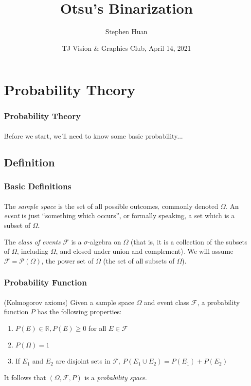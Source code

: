 \documentclass{beamer}                             %
\title[]{Otsu's Binarization}
\subtitle{}
\author[Huan]{Stephen Huan\inst{1}}
\institute[TJHSST]
{
  \inst{1}
  Thomas Jefferson High School for Science and Technology
}
\date[]{TJ Vision \& Graphics Club, April 14, 2021}
\begin{document}
\frame{\titlepage}

\section{Probability Theory}

\begin{frame}
\frametitle{Probability Theory}
\framesubtitle{}
Before we start, we'll need to know some basic probability...
\end{frame}

\subsection{Definition}

\begin{frame}
\frametitle{Basic Definitions}
\framesubtitle{}

\begin{definition}
  The \textit{sample space} is the set of all possible outcomes, commonly
  denoted \( \Omega \). An \textit{event} is just \enquote{something which
  occurs}, or formally speaking, a set which is a subset of \( \Omega \).
\end{definition}

\begin{definition}
  The \textit{class of events} \( \mathcal{F} \) is a \( \sigma \)-algebra
  on \( \Omega \) (that is, it is a collection of the subsets of \( \Omega
  \), including \( \Omega \), and closed under union and complement). We
  will assume \( \mathcal{F} = \mathcal{P}(\Omega) \), the power set of \(
  \Omega \) (the set of all subsets of \( \Omega \)).
\end{definition}

\end{frame}

\begin{frame}
\frametitle{Probability Function}
\framesubtitle{}
\begin{definition}
  (Kolmogorov axioms) Given a sample space \( \Omega \) and event class \(
  \mathcal{F} \), a probability function \( P \) has the following properties:
  \begin{enumerate}
    \item \( P(E) \in \mathbb{R}, P(E) \geq 0 \) for all \( E \in \mathcal{F} \) 
    \item \( P(\Omega) = 1 \)
    \item If \( E_1 \) and \( E_2 \) are disjoint sets in \( \mathcal{F} \),
      \( P(E_1 \cup E_2) = P(E_1) + P(E_2) \)
  \end{enumerate}
  It follows that \( (\Omega, \mathcal{F}, P) \)
  is a \textit{probability space}.
\end{definition} 
\end{frame}
\end{document}
